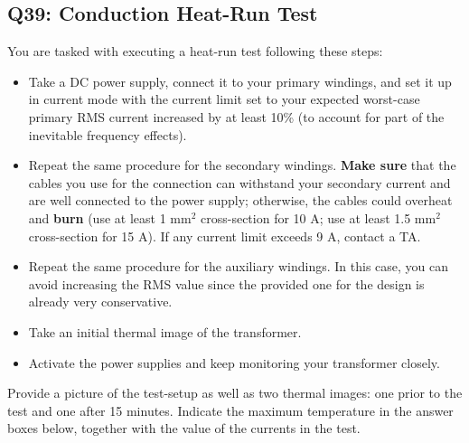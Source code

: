 \documentclass{PELsmallreport}
\begin{document}
\subsection{Q39: Conduction Heat-Run Test} 
You are tasked with executing a heat-run test following these steps:
\begin{itemize}
    \item Take a DC power supply, connect it to your primary windings, and set it up in current mode with the current limit set to your expected worst-case primary RMS current increased by at least 10\% (to account for part of the inevitable frequency effects). 
    \item Repeat the same procedure for the secondary windings. \textbf{Make sure} that the cables you use for the connection can withstand your secondary current and are well connected to the power supply; otherwise, the cables could overheat and \textbf{burn} (use at least 1 $\mathrm{mm}^2$ cross-section for 10 A; use at least 1.5 $\mathrm{mm}^2$ cross-section for 15 A). If any current limit exceeds 9 A, contact a TA. 
    \item Repeat the same procedure for the auxiliary windings. In this case, you can avoid increasing the RMS value since the provided one for the design is already very conservative. 
    \item Take an initial thermal image of the transformer.
    \item Activate the power supplies and keep monitoring your transformer closely. 
\end{itemize}
Provide a picture of the test-setup as well as two thermal images: one prior to the test and one after 15 minutes. 
Indicate the maximum temperature in the answer boxes below, together with the value of the currents in the test. 
\end{document}
